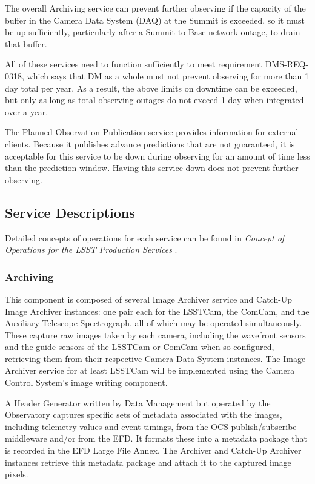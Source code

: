 \documentclass[DM,toc,lsstdraft]{lsstdoc}
\begin{document}
The overall Archiving service can prevent further observing if the capacity of the buffer in the Camera Data System (DAQ) at the Summit is exceeded, so it must be up sufficiently, particularly after a Summit-to-Base network outage, to drain that buffer.

All of these services need to function sufficiently to meet requirement DMS-REQ-0318, which says that DM as a whole must not prevent observing for more than 1 day total per year.
As a result, the above limits on downtime can be exceeded, but only as long as total observing outages do not exceed 1 day when integrated over a year.

The Planned Observation Publication service provides information for external clients.
Because it publishes advance predictions that are not guaranteed, it is acceptable for this service to be down during observing for an amount of time less than the prediction window.
Having this service down does not prevent further observing.

\subsection{Service Descriptions}\label{base-service-descriptions}

Detailed concepts of operations for each service can be found in
\textit{Concept of Operations for the LSST Production Services} .


\subsubsection{Archiving}\label{archiving}

This component is composed of several Image Archiver service and
Catch-Up Image Archiver instances: one pair each for the LSSTCam, the
ComCam, and the Auxiliary Telescope Spectrograph, all of which may be
operated simultaneously. These capture raw images taken by each camera,
including the wavefront sensors and the guide sensors of the LSSTCam or
ComCam when so configured, retrieving them from their respective Camera
Data System instances.
The Image Archiver service for at least LSSTCam will be implemented using the Camera Control System's image writing component.

A Header Generator written by Data Management but operated by the Observatory captures specific sets of metadata
associated with the images, including telemetry values and event
timings, from the OCS publish/subscribe middleware and/or from the EFD.
It formats these into a metadata package that is recorded in the EFD Large File Annex.
The Archiver and Catch-Up Archiver instances retrieve this metadata package and attach it to the captured image pixels.
\end{document}
